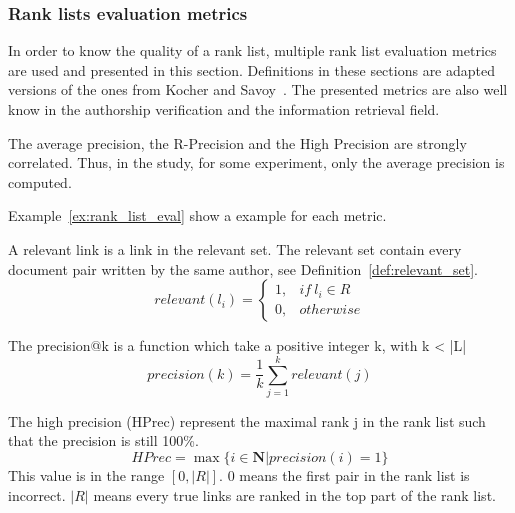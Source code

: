 \subsubsection{Rank lists evaluation metrics \label{sec:rl_eval}}

In order to know the quality of a rank list, multiple rank list evaluation metrics are used and presented in this section.
Definitions in these sections are adapted versions of the ones from Kocher and Savoy~\cite{kocher_linking}.
The presented metrics are also well know in the authorship verification and the information retrieval field.

The average precision, the R-Precision and the High Precision are strongly correlated.
Thus, in the study, for some experiment, only the average precision is computed.

Example~\ref{ex:rank_list_eval} show a example for each metric.

\begin{definition}
  A relevant link is a link in the relevant set.
  The relevant set contain every document pair written by the same author, see Definition~\ref{def:relevant_set}.
  \begin{equation}
    relevant(l_i) =
    \begin{cases}
      1, & if\ l_i \in R \\
      0, & otherwise
    \end{cases}
  \end{equation}
\end{definition}

\begin{definition}
  The precision@k is a function which take a positive integer k, with k < |L|
  \begin{equation}
    precision(k) = \frac{1}{k} \sum_{j=1}^{k} relevant(j)
  \end{equation}
\end{definition}

\begin{definition}
  The high precision (HPrec) represent the maximal rank j in the rank list such that the precision is still 100\%.
  \begin{equation}
    HPrec = \max\{i \in \mathbf{N} | precision(i) = 1\}
  \end{equation}
  This value is in the range $\left[0, |R|\right]$.
  $0$ means the first pair in the rank list is incorrect.
  $|R|$ means every true links are ranked in the top part of the rank list.
\end{definition}

